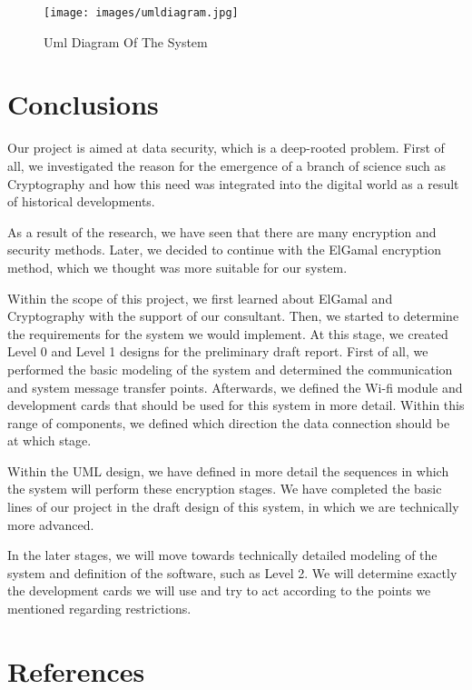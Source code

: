 \documentclass[12pt]{article}
\begin{document}
 	\begin{figure}[h]
 		\centering
 		\label{Uml Diagram Of The System}
 		\texttt{[image: images/umldiagram.jpg]}\\[0.5 cm]	
 		\caption{Uml Diagram Of The System} 		
 	\end{figure}
	\section{Conclusions}
	
	Our project is aimed at data security, which is a deep-rooted problem. First of all, we investigated the reason for the emergence of a branch of science such as Cryptography and how this need was integrated into the digital world as a result of historical developments.
	
	As a result of the research, we have seen that there are many encryption and security methods.
	Later, we decided to continue with the ElGamal encryption method, which we thought was more suitable for our system.
	
	Within the scope of this project, we first learned about ElGamal and Cryptography with the support of our consultant. Then, we started to determine the requirements for the system we would implement. At this stage, we created Level 0 and Level 1 designs for the preliminary draft report. First of all, we performed the basic modeling of the system and determined the communication and system message transfer points. Afterwards, we defined the Wi-fi module and development cards that should be used for this system in more detail. Within this range of components, we defined which direction the data connection should be at which stage.
	
	Within the UML design, we have defined in more detail the sequences in which the system will perform these encryption stages. We have completed the basic lines of our project in the draft design of this system, in which we are technically more advanced.
	
	In the later stages, we will move towards technically detailed modeling of the system and definition of the software, such as Level 2. We will determine exactly the development cards we will use and try to act according to the points we mentioned regarding restrictions.
	
	\section{References}
	
\end{document}
